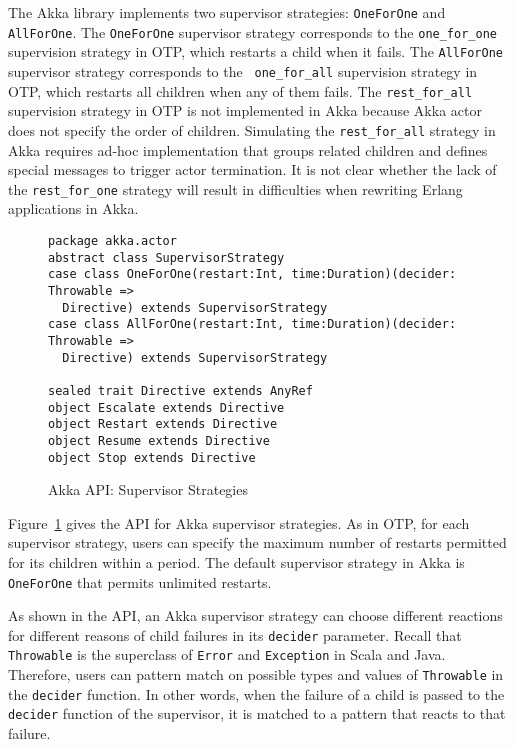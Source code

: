 The Akka library implements two supervisor strategies: {\tt OneForOne} and 
{\tt AllForOne}.  The {\tt OneForOne} supervisor strategy corresponds to the
{\tt one\_for\_one} supervision strategy in OTP, which restarts a child when it 
fails.  The {\tt AllForOne} supervisor strategy corresponds to the {\tt 
one\_for\_all} supervision strategy in OTP, which restarts all children when 
any of them fails.  The {\tt rest\_for\_all} supervision strategy in OTP is not
implemented in Akka because Akka actor does not specify the order of children.  
Simulating the {\tt rest\_for\_all} strategy in Akka 
requires ad-hoc implementation that groups related children and defines special 
messages to trigger actor termination. It is not clear whether the lack of the 
{\tt rest\_for\_one} strategy will result in difficulties when rewriting Erlang 
applications in Akka.

\begin{figure}[h]
    \begin{lstlisting}    
package akka.actor
abstract class SupervisorStrategy
case class OneForOne(restart:Int, time:Duration)(decider: Throwable => 
  Directive) extends SupervisorStrategy
case class AllForOne(restart:Int, time:Duration)(decider: Throwable => 
  Directive) extends SupervisorStrategy

sealed trait Directive extends AnyRef
object Escalate extends Directive
object Restart extends Directive
object Resume extends Directive
object Stop extends Directive
    \end{lstlisting}
    \caption{Akka API: Supervisor Strategies}
    \label{akka_supervisor_strategy}
\end{figure}

Figure~\ref{akka_supervisor_strategy} gives the API for Akka supervisor 
strategies. As in OTP, for each supervisor strategy, users can specify the 
maximum number of restarts permitted for its children within a period.  The 
default supervisor strategy in Akka is {\tt OneForOne} that permits unlimited 
restarts. 

As shown in the API, an Akka supervisor strategy can choose different 
reactions for different reasons of child failures in its {\tt decider} 
parameter.  Recall that {\tt Throwable} is the superclass of {\tt Error} and 
{\tt Exception} in Scala and Java.  Therefore, users can pattern match on 
possible types and values of {\tt Throwable} in the {\tt decider} function.  In 
other words, when the failure of a child is passed to the {\tt decider} 
function of the supervisor, it is matched to a pattern that reacts to that 
failure.

